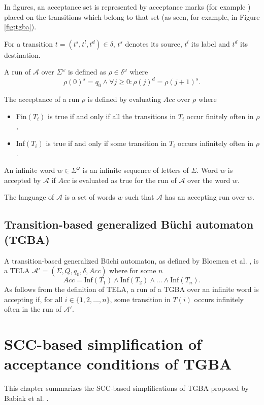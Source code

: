 \documentclass[
  digital, %
  twoside, %
  table,   %
  lof,     %
  lot,     %
]{fithesis3}
\begin{document}
In figures, an acceptance set is represented by acceptance marks (for example \accmarkblue) placed on the transitions which belong to that set (as seen, for example, in Figure \ref{fig:tgba}). 

For a transition $t = (t^s, t^l, t^d) \in \delta$, $t^s$ denotes its source, $t^l$ its label and $t^d$ its destination.

A run of $\mathcal{A}$ over $\Sigma^\omega$ is defined as $\rho \in \delta^\omega$ where 
\begin{equation*}
  \rho(0)^s = q_0 \wedge \forall j \geq 0 \colon \rho(j)^d = \rho(j + 1)^s.
\end{equation*}

The acceptance of a run $\rho$ is defined by evaluating $Acc$ over $\rho$ where
\begin{itemize}
  \item Fin$(T_i)$ is true if and only if all the transitions in $T_i$ occur finitely often in $\rho$, 
  \item Inf$(T_i)$ is true if and only if some transition in $T_i$ occurs infinitely often in $\rho$.
\end{itemize}

An infinite word $w \in \Sigma^\omega$ is an infinite sequence of letters of $\Sigma$. Word $w$ is accepted by $\mathcal{A}$ if $Acc$ is evaluated as true for the run of $\mathcal{A}$ over the word $w$. 

The language of $\mathcal{A}$ is a set of words $w$ such that $\mathcal{A}$ has an accepting run over $w$.

\section{Transition-based generalized Büchi automaton (TGBA)}
\label{sec:tgba}
A transition-based generalized Büchi automaton, as defined by Bloemen et al. \cite{bloemen2017}, is a TELA $\mathcal{A'} = (\Sigma, Q, q_0, \delta, Acc)$ where for some $n$
\begin{equation*}
  Acc = \text{Inf}(T_1) \wedge \text{Inf}(T_2) \wedge \dots \wedge \text{Inf}(T_n).
\end{equation*} 
As follows from the definition of TELA, a run of a TGBA over an infinite word is accepting if, for all $i \in \{1, 2, \dots, n\}$, some transition in $T(i)$ occurs infinitely often in the run of $\mathcal{A'}$. 

\chapter{SCC-based simplification of acceptance conditions of TGBA} 
\label{chap:tgba_simpl}
This chapter summarizes the SCC-based simplifications of TGBA proposed by Babiak et al. \cite{spin2013}.
\end{document}
